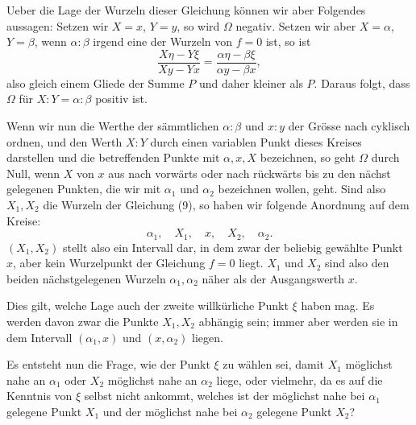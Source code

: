 \documentclass[11pt]{article}
\begin{document}
Ueber die Lage der Wurzeln dieser Gleichung können wir aber Folgendes aussagen: Setzen wir $X=x$, $Y=y$, so wird $\Omega$ negativ. Setzen wir aber $X=\alpha$, $Y=\beta$, wenn $\alpha:\beta$ irgend eine der Wurzeln von $f=0$ ist, so ist
\[
        \frac{X\eta-Y\xi}{Xy-Yx}
        =
        \frac{\alpha\eta-\beta\xi}{\alpha y-\beta x},
\]
also gleich einem Gliede der Summe $P$ und daher kleiner als $P$. Daraus folgt, dass $\Omega$ für $X:Y=\alpha:\beta$ positiv ist.

Wenn wir nun die Werthe der sämmtlichen $\alpha:\beta$ und $x:y$ der Grösse nach cyklisch ordnen, und den Werth $X:Y$ durch einen variablen Punkt dieses Kreises darstellen und die betreffenden Punkte mit $\alpha,x,X$ bezeichnen, so geht $\Omega$ durch Null, wenn $X$ von $x$ aus nach vorwärts oder nach rückwärts bis zu den nächst gelegenen Punkten, die wir mit $\alpha_1$ und $\alpha_2$ bezeichnen wollen, geht. Sind also $X_1,X_2$ die Wurzeln der Gleichung (9), so haben wir folgende Anordnung auf dem Kreise:
\begin{equation}
        \alpha_1,\quad X_1,\quad x,\quad X_2,\quad \alpha_2.
\tag{10}
\end{equation}
$(X_1,X_2)$ stellt also ein Intervall dar, in dem zwar der beliebig gewählte Punkt $x$, aber kein Wurzelpunkt der Gleichung $f=0$ liegt. $X_1$ und $X_2$ sind also den beiden nächstgelegenen Wurzeln $\alpha_1,\alpha_2$ näher als der Ausgangswerth $x$.

Dies gilt, welche Lage auch der zweite willkürliche Punkt $\xi$ haben mag. Es werden davon zwar die Punkte $X_1,X_2$ abhängig sein; immer aber werden sie in dem Intervall $(\alpha_1,x)$ und $(x,\alpha_2)$ liegen.

Es entsteht nun die Frage, wie der Punkt $\xi$ zu wählen sei, damit $X_1$ möglichst nahe an $\alpha_1$ oder $X_2$ möglichst nahe an $\alpha_2$ liege, oder vielmehr, da es auf die Kenntnis von $\xi$ selbst nicht ankommt, welches ist der möglichst nahe bei $\alpha_1$ gelegene Punkt $X_1$ und der möglichst nahe bei $\alpha_2$ gelegene Punkt $X_2$?
\end{document}
